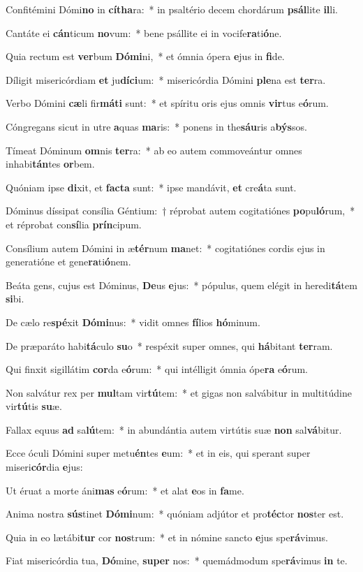 \item Confitémini Dómi\textbf{no} in \textbf{cí}\textbf{tha}ra:~* in psaltério decem chordárum \textbf{psál}lite \textbf{il}li.
\item Cantáte ei \textbf{cán}ticum \textbf{no}vum:~* bene psállite ei in vocife\textbf{ra}ti\textbf{ó}ne.
\item Quia rectum est \textbf{ver}bum \textbf{Dó}\textbf{mi}ni,~* et ómnia ópera \textbf{e}jus in \textbf{fi}de.
\item Díligit misericórdiam \textbf{et} ju\textbf{dí}\textbf{ci}um:~* misericórdia Dómini \textbf{ple}na est \textbf{ter}ra.
\item Verbo Dómini \textbf{cæ}li fir\textbf{má}\textbf{ti} sunt:~* et spíritu oris ejus omnis \textbf{vir}tus e\textbf{ó}rum.
\item Cóngregans sicut in utre \textbf{a}quas \textbf{ma}ris:~* ponens in the\textbf{sáu}ris a\textbf{býs}sos.
\item Tímeat Dóminum \textbf{om}nis \textbf{ter}ra:~* ab eo autem commoveántur omnes inhabi\textbf{tán}tes \textbf{or}bem.
\item Quóniam ipse \textbf{di}xit, et \textbf{fac}\textbf{ta} sunt:~* ipse mandávit, \textbf{et} cre\textbf{á}ta sunt.
\item Dóminus díssipat consília Géntium:~† réprobat autem cogitatiónes \textbf{po}pu\textbf{ló}rum,~* et réprobat con\textbf{sí}lia \textbf{prín}cipum.
\item Consílium autem Dómini in æ\textbf{tér}num \textbf{ma}net:~* cogitatiónes cordis ejus in generatióne et gene\textbf{ra}ti\textbf{ó}nem.
\item Beáta gens, cujus est Dóminus, \textbf{De}us \textbf{e}jus:~* pópulus, quem elégit in heredi\textbf{tá}tem \textbf{si}bi.
\item De cælo re\textbf{spé}xit \textbf{Dó}\textbf{mi}nus:~* vidit omnes \textbf{fí}lios \textbf{hó}minum.
\item De præparáto habi\textbf{tá}culo \textbf{su}o~* respéxit super omnes, qui \textbf{há}bitant \textbf{ter}ram.
\item Qui finxit sigillátim \textbf{cor}da e\textbf{ó}rum:~* qui intélligit ómnia ópe\textbf{ra} e\textbf{ó}rum.
\item Non salvátur rex per \textbf{mul}tam vir\textbf{tú}tem:~* et gigas non salvábitur in multitúdine vir\textbf{tú}tis \textbf{su}æ.
\item Fallax equus \textbf{ad} sa\textbf{lú}tem:~* in abundántia autem virtútis suæ \textbf{non} sal\textbf{vá}bitur.
\item Ecce óculi Dómini super metu\textbf{én}tes \textbf{e}um:~* et in eis, qui sperant super miseri\textbf{cór}dia \textbf{e}jus:
\item Ut éruat a morte áni\textbf{mas} e\textbf{ó}rum:~* et alat \textbf{e}os in \textbf{fa}me.
\item Anima nostra \textbf{sús}tinet \textbf{Dó}\textbf{mi}num:~* quóniam adjútor et pro\textbf{téc}tor \textbf{nos}ter est.
\item Quia in eo lætábi\textbf{tur} cor \textbf{nos}trum:~* et in nómine sancto \textbf{e}jus spe\textbf{rá}vimus.
\item Fiat misericórdia tua, \textbf{Dó}mine, \textbf{su}\textbf{per} nos:~* quemádmodum spe\textbf{rá}vimus \textbf{in} te.

